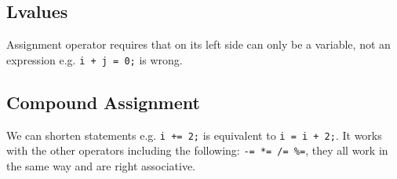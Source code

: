 \documentclass[12pt, openany]{book}
\begin{document}
    \subsection*{Lvalues}
    Assignment operator requires that on its left side can only be a variable, not an
    expression e.g. \texttt{i + j = 0;} is wrong.

    \subsection*{Compound Assignment}
    We can shorten statements e.g. \texttt{i += 2;} is equivalent to
    \texttt{i = i + 2;}. It works with the other operators including the following:
    \texttt{-= *= /= \%=}, they all work in the same way and are right associative.
\end{document}
